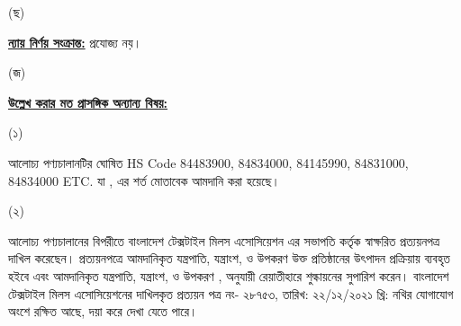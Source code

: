\documentclass[12pt]{article}
\newcommand{\hscode}{84483900, 84834000, 84145990, 84831000, 84834000 ETC.  }
\newcommand{\btmaltno}{প্রত্যয়ন পত্র নং- ২৮৭৫৩}
\newcommand{\btmaltnodt}{তারিখ:  ২২/১২/২০২১ খ্রি:}
\begin{document}
\begin{minipage}[t]{0.05\linewidth}
(ছ)
\end{minipage}
\begin{minipage}[t]{0.90\linewidth}
\underline{\textbf{ন্যায় নির্ণয় সংক্রান্ত:}} প্রযোজ্য নয়।
\\
\end{minipage}
\begin{minipage}[t]{0.05\linewidth}
\hspace{1em}
\end{minipage}
\begin{minipage}[t]{0.05\linewidth}
(জ)
\end{minipage}
\begin{minipage}[t]{0.05\linewidth}
\end{minipage}
\begin{minipage}[t]{0.90\linewidth}
\underline{\textbf{উল্লেখ করার মত প্রাসঙ্গিক অন্যান্য বিষয়:}}
\end{minipage}
\begin{minipage}[t]{0.05\linewidth}
\hspace{1em}
\end{minipage}
\begin{minipage}[t]{0.05\linewidth}
\hspace{1em}
\end{minipage}
\begin{minipage}[t]{0.05\linewidth}
(১)
\end{minipage}
\begin{minipage}[t]{0.85\linewidth}
আলোচ্য পণ্যচালানটির ঘোষিত HS Code {\hscode}
যা {\srootz}, {\srootzd} এর শর্ত মোতাবেক
আমদানি করা হয়েছে।
\end{minipage}
\begin{minipage}[t]{0.05\linewidth}
\hspace{1em}
\end{minipage}
\begin{minipage}[t]{0.05\linewidth}
\hspace{1em}
\end{minipage}
\begin{minipage}[t]{0.05\linewidth}
(২)
\end{minipage}
\begin{minipage}[t]{0.85\linewidth}
আলোচ্য পণ্যচালানের বিপরীতে বাংলাদেশ
টেক্সটাইল মিলস এসোসিয়েশন এর সভাপতি
কর্তৃক স্বাক্ষরিত প্রত্যয়নপত্র
দাখিল করেছেন। প্রত্যয়নপত্রে আমদানিকৃত
যন্ত্রপাতি, যন্ত্রাংশ, ও উপকরণ
উক্ত প্রতিষ্ঠানের উৎপাদন প্রক্রিয়ায়
ব্যবহৃত হইবে এবং আমদানিকৃত
যন্ত্রপাতি, যন্ত্রাংশ, ও উপকরণ
{\srootz}, {\srootzd} অনুযায়ী
রেয়াতীহারে শুল্কায়নের সুপারিশ
করেন। বাংলাদেশ টেক্সটাইল মিলস
এসোসিয়েশনের দাখিলকৃত
{\btmaltno},
{\btmaltnodt}
নথির যোগাযোগ অংশে রক্ষিত
আছে, দয়া করে দেখা যেতে পারে।
\end{minipage}
\end{document}

